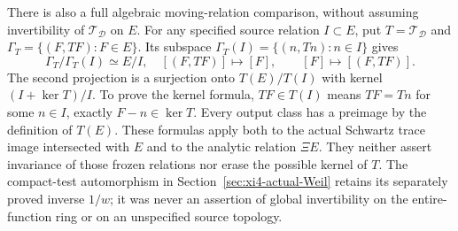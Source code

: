 There is also a full algebraic moving-relation comparison, without
assuming invertibility of $\mathcal T_{\mathcal D}$ on $E$.
For any specified source relation $I\subset E$, put
$T=\mathcal T_{\mathcal D}$ and
$\Gamma_T=\{(F,TF):F\in E\}$.
Its subspace $\Gamma_T(I)=\{(n,Tn):n\in I\}$ gives
\[
 \Gamma_T/\Gamma_T(I)\simeq E/I,
 \quad[(F,TF)]\mapsto[F],\qquad
 [F]\mapsto[(F,TF)].
\]
The second projection is a surjection onto $T(E)/T(I)$ with kernel
$(I+\ker T)/I$. To prove the kernel formula, $TF\in T(I)$ means
$TF=Tn$ for some $n\in I$, exactly $F-n\in\ker T$.
Every output class has a preimage by the definition of $T(E)$.
These formulas apply both to the actual Schwartz trace image
intersected with $E$ and to the analytic relation $\Xi E$.
They neither assert invariance of those frozen relations nor erase
the possible kernel of $T$. The compact-test automorphism in
Section~\ref{sec:xi4-actual-Weil} retains its separately proved
inverse $1/w$; it was never an assertion of global invertibility
on the entire-function ring or on an unspecified source topology.
